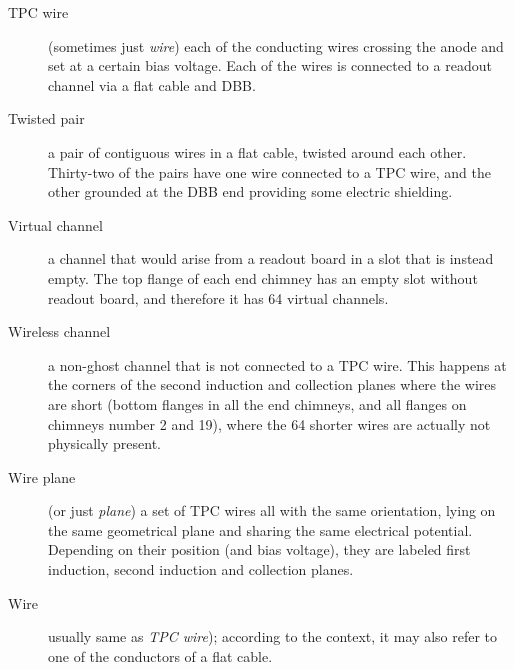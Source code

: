 \begin{description}
  \item[TPC wire]
    (sometimes just \emph{wire}) each of the conducting wires
    crossing the anode and set at a certain bias voltage.
    Each of the wires is connected to a readout channel via a flat cable and DBB.

  \item[Twisted pair]
    a pair of contiguous wires in a flat cable, twisted around
    each other. Thirty-two of the pairs have one wire connected to a TPC wire,
    and the other grounded at the DBB end providing some electric shielding.

  \item[Virtual channel]
    a channel that would arise from a readout board in a slot that is instead
    empty. The top flange of each end chimney has an empty slot without readout
    board, and therefore it has 64 virtual channels.
  
  \item[Wireless channel]
    a non-ghost channel that is not connected to a TPC wire.
    This happens at the corners of the second induction and collection planes
    where the wires are short (bottom flanges in all the end chimneys, and all
    flanges on chimneys number 2 and 19), where the 64 shorter wires are
    actually not physically present.
  
  \item[Wire plane]
    (or just \emph{plane}) a set of TPC wires all with the same
    orientation, lying on the same geometrical plane and sharing the same
    electrical potential.
    Depending on their position (and bias voltage), they are labeled first
    induction, second induction and collection planes.

  \item[Wire]
    usually same as \emph{TPC wire}); according to the context,
    it may also refer to one of the conductors of a flat cable.

\end{description}

